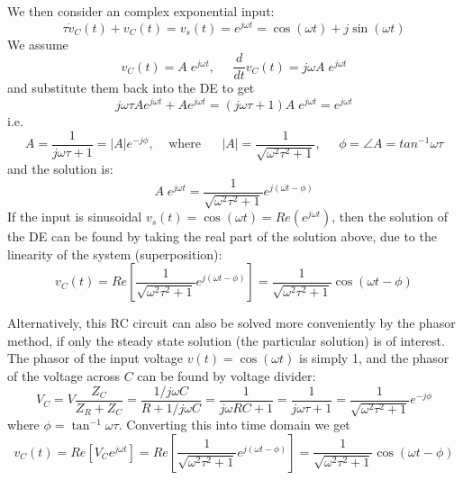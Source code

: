\documentclass{article}
\begin{document}
We then consider an complex exponential input:
\begin{equation}	
  \tau\dot{v}_C(t)+v_C(t)=v_s(t)=e^{j\omega t}=\cos(\omega t)+j\sin(\omega t)
\end{equation}
We assume
\begin{equation} 
  v_C(t)=A\;e^{j\omega t},\;\;\;\;\;\frac{d}{dt}v_C(t)=j\omega A\;e^{j\omega t} 
\end{equation}
and substitute them back into the DE to get
\begin{equation}
  j\omega \tau A e^{j\omega t}+A e^{j\omega t}
  =(j\omega \tau+1)A\; e^{j\omega t}=e^{j\omega t} 
\end{equation}
i.e.
\begin{equation}
  A=\frac{1}{j\omega\tau+1}=|A|e^{-j\phi},\;\;\;\;\mbox{where}
  \;\;\;\;\;\;|A|=\frac{1}{\sqrt{\omega^2 \tau^2+1}},\;\;\;\;\;
  \phi=\angle A=tan^{-1}\omega\tau
\end{equation}
and the solution is:
\begin{equation}
  A\;e^{j\omega t}=\frac{1}{\sqrt{\omega^2 \tau^2+1}} e^{j(\omega t-\phi)} 
\end{equation}
If the input is sinusoidal $v_s(t)=\cos(\omega t)=Re(e^{j\omega t})$,
then the solution of the DE can be found by taking the real part 
of the solution above, due to the linearity of the system
(superposition):
\begin{equation}
  v_C(t)=Re\left[\frac{1}{\sqrt{\omega^2 \tau^2+1}} e^{j(\omega t-\phi)}\right]
  =\frac{1}{\sqrt{\omega^2 \tau^2+1}} \cos(\omega t-\phi)
\end{equation}

Alternatively, this RC circuit can also be solved more conveniently by
the phasor method, if only the steady state solution (the particular
solution) is of interest. The phasor of the input voltage 
$v(t)=\cos(\omega t)$ is simply 1, and the phasor of the voltage across
$C$ can be found by voltage divider:
\begin{equation}
  V_C=V\frac{Z_C}{Z_R+Z_C}=\frac{1/j\omega C}{R+1/j\omega C}
  =\frac{1}{j\omega RC+1}=\frac{1}{j\omega \tau+1}
  =\frac{1}{\sqrt{\omega^2\tau^2+1}} e^{-j\phi}
\end{equation}
where $\phi=\tan^{-1}\omega\tau$. Converting this into time domain
we get
\begin{equation}
  v_C(t)=Re[V_Ce^{j\omega t}]
  =Re\left[\frac{1}{\sqrt{\omega^2\tau^2+1}}e^{j(\omega t-\phi)}\right]
  =\frac{1}{\sqrt{\omega^2\tau^2+1}}\cos(\omega t-\phi)
\end{equation}
\end{document}
